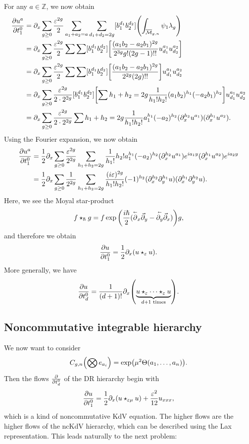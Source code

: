 \documentclass[leqno, openany]{memoir}
\theoremstyle{definition}
\theoremstyle{remark}
\theoremstyle{plain}
\theoremstyle{definition}
\theoremstyle{remark}
\newcommand{\Z}{\mathbb{Z}}
\newcommand{\ep}{\varepsilon}
\newcommand{\mc}[1]{\mathcal{#1}}
\newcommand{\ol}[1]{\overline{#1}}
\begin{document}
For any $a \in \Z$, we now obtain
\begin{align*}
    \pdv{u^a}{t_1^0} &= \partial_x \sum_{g \geq 0} \frac{\ep^{2g}}{2} \sum_{a_1+a_2=a} \sum_{d_1+d_2 = 2g} [b_1^{d_1} b_2^{d_2}] \qty(\int_{\ol{\mc{M}}_{g,n}} \psi_1 \lambda_g) \\
    &= \partial_x \sum_{g \geq 0} \frac{\ep^{2g}}{2} \sum \sum [b_1^{d_1} b_2^{d_2}] \qty[\frac{(a_1b_2 - a_2 b_1)^{2g}}{2^{3g}g! (2g-1)!!} u_{d_1}^{a_1} u_{d_2}^{a_2}] \\
    &= \partial_x \sum_{g \geq 0} \frac{\ep^{2g}}{2} \sum \sum [b_1^{d_1} b_2^{d_2}] \qty[\frac{(a_1b_2 - a_2 b_1)^{2g}}{2^{2g}(2g)!!}] u_{d_1}^{a_1} u_{d_2}^{a_2} \\
    &= \partial_x \sum_{g \geq 0} \frac{\ep^{2g}}{2 \cdot 2^{2g}} [b_1^{d_1} b_2^{d_2}] \qty[\sum h_1+h_2=2g \frac{1}{h_1! h_2!}(a_1b_2)^{h_1}(-a_2b_1)^{h_2}] u_{d_1}^{a_1} u_{d_2}^{a_2} \\
    &= \partial_x \sum_{g \geq 0} \frac{\ep^{2g}}{2 \cdot 2^{2g}} \sum h_1+h_2=2g \frac{1}{h_1! h_2!} a_1^{h_1}(-a_2)^{h_2} (\partial_x^{h_2}u^{a_1})(\partial_x^{h_1} u^{a_2}).
\end{align*}
Using the Fourier expansion, we now obtain
\begin{align*}
    \pdv{u^a}{t_1^0} &= \frac{1}{2} \partial_x \sum_{g \geq 0} \frac{\ep^{2g}}{2^{2g}} \sum_{h_1+h_2=2g} \frac{1}{h_1!}{h_2!} a_1^{h_1}(-a_2)^{h_2} (\partial_x^{h_2}u^{a_1}) e^{ia_1y} (\partial_x^{h_1} u^{a_2}) e^{ia_2 y}  \\
    &= \frac{1}{2} \partial_x \sum_{g \geq 0} \frac{1}{2^{2g}} \sum_{h_1+h_2=2g} \frac{(i\ep)^{2g}}{h_1! h_2!}(-1)^{h_2} (\partial_x^{h_2} \partial_y^{h_1} u)(\partial_x^{h_1} \partial_y^{h_2}u).  \\
\end{align*}
Here, we see the Moyal star-product
\[ f \star_{\hslash} g = f \exp\qty(\frac{i\hslash}{2} (\overset{\shortleftarrow}{\partial}_x \vec{\partial}_y - \overset{\shortleftarrow}{\partial_y} \vec{\partial}_x))g, \]
and therefore we obtain
\[ \pdv{u}{t_1^0} = \frac{1}{2} \partial_x (u \star_{\ep} u). \]
More generally, we have
\[ \pdv{u}{t_d^0} = \frac{1}{(d+1)!} \partial_x \qty(\underbrace{u \star_{\ep} \cdots \star_{\ep} u}_{d+1\text{ times}}). \]

\subsection{Noncommutative integrable hierarchy}

We now want to consider
\[ C_{g,n}\qty(\bigotimes e_{a_i}) = \exp(\mu^2 \Theta(a_1, \ldots, a_n)). \]
Then the flows $\pdv{t_d^0}$ of the DR hierarchy begin with
\[ \pdv{u}{t_1^0} = \frac{1}{2} \partial_x(u \star_{\ep\mu} u) + \frac{\ep^2}{12} u_{x x x}, \]
which is a kind of noncommutative KdV equation. The higher flows are the higher flows of the ncKdV hierarchy, which can be described using the Lax representation. This leads naturally to the next problem:
\end{document}
